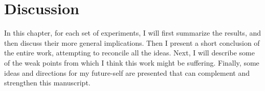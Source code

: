 \chapter{Discussion}
\label{ch:discussion}
In this chapter, for each set of experiments, I will first summarize the results, and then discuss their more general implications.
Then I present a short conclusion of the entire work, attempting to reconcile all the ideas.
Next, I will describe some of the weak points from which I think this work might be suffering.
Finally, some ideas and directions for my future-self are presented that can complement and strengthen this manuscript.




